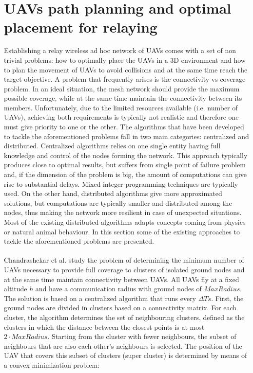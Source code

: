 \section{UAVs path planning and optimal placement for relaying}
\label{sec:uav-placement}
Establishing a relay wireless ad hoc network of \glspl{UAV} comes with a set of non trivial problems: how to optimally place the \glspl{UAV} in a 3D environment and how to plan the movement of \glspl{UAV} to avoid collisions and at the same time reach the target objective. A problem that frequently arises is the connectivity vs coverage problem. In an ideal situation, the mesh network should provide the maximum possible coverage, while at the same time maintain the connectivity between its members. Unfortunately, due to the limited resources available (i.e. number of \glspl{UAV}), achieving both requirements is typically not realistic and therefore one must give priority to one or the other. The algorithms that have been developed to tackle the aforementioned problems fall in two main categories: centralized and distributed. Centralized algorithms relies on one single entity having full knowledge and control of the nodes forming the network. This approach typically produces close to optimal results, but suffers from single point of failure problem and, if the dimension of the problem is big, the amount of computations can give rise to substantial delays. Mixed integer programming techniques are typically used. On the other hand, distributed algorithms give more approximated solutions, but computations are typically smaller and distributed among the nodes, thus making the network more resilient in case of unexpected situations. Most of the existing distributed algorithms adapts concepts coming from physics or natural animal behaviour. In this section some of the existing approaches to tackle the aforementioned problems are presented. \\\\
Chandrashekar et al. \cite{ref:soa-plac-centr1} study the problem of determining the minimum number of \glspl{UAV} necessary to provide full coverage to clusters of isolated ground nodes and at the same time maintain connectivity between \glspl{UAV}. All \glspl{UAV} fly at a fixed altitude $h$ and have a communication radius with ground nodes of $MaxRadius$. The solution is based on a centralized algorithm that runs every $\Delta T s$. First, the ground nodes are divided in clusters based on a connectivity matrix.
For each cluster, the algorithm determines the set of neighbouring clusters, defined as the clusters in which the distance between the closest points is at most $2 \cdot MaxRadius$. Starting from the cluster with fewer neighbours, the subset of neighbours that are also each other's neighbours is selected. The position of the \gls{UAV} that covers this subset of clusters (super cluster) is determined by means of a convex minimization problem:

